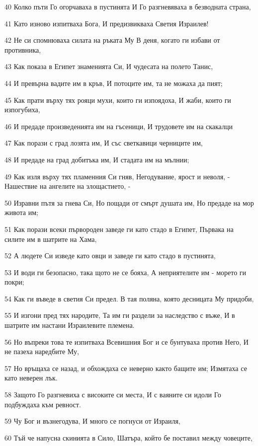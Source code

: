 \par 40 Колко пъти Го огорчаваха в пустинята И Го разгневяваха в безводната страна,
\par 41 Като изново изпитваха Бога, И предизвикваха Светия Израилев!
\par 42 Не си спомнюваха силата на ръката Му В деня, когато ги избави от противника,
\par 43 Как показа в Египет знаменията Си, И чудесата на полето Танис,
\par 44 И превърна вадите им в кръв, И потоците им, та не можаха да пият;
\par 45 Как прати върху тях рояци мухи, които ги изпоядоха, И жаби, които ги изпогубиха,
\par 46 И предаде произведенията им на гъсеници, И трудовете им на скакалци
\par 47 Как порази с град лозята им, И със светкавици черниците им,
\par 48 И предаде на град добитъка им, И стадата им на мълнии;
\par 49 Как изля върху тях пламенния Си гняв, Негодувание, ярост и неволя, - Нашествие на ангелите на злощастието, -
\par 50 Изравни пътя за гнева Си, Но пощади от смърт душата им, Но предаде на мор живота им;
\par 51 Как порази всеки първороден заведе ги като стадо в Египет, Първака на силите им в шатрите на Хама,
\par 52 А людете Си изведе като овци и заведе ги като стадо в пустинята,
\par 53 И води ги безопасно, така щото не се бояха, А неприятелите им - морето ги покри;
\par 54 Как ги въведе в светия Си предел. В тая поляна, която десницата Му придоби,
\par 55 И изгони пред тях народите, Та им ги раздели за наследство с въже, И в шатрите им настани Израилевите племена.
\par 56 Но въпреки това те изпитваха Всевишния Бог и се бунтуваха против Него, И не пазеха наредбите Му,
\par 57 Но връщаха се назад, и обхождаха се неверно както бащите им; Измятаха се като неверен лък.
\par 58 Защото Го разгневиха с високите си места, И с ваяните си идоли Го подбуждаха към ревност.
\par 59 Чу Бог и възнегодува, И много се погнуси от Израиля,
\par 60 Тъй че напусна скинията в Сило, Шатъра, който бе поставил между човеците,
